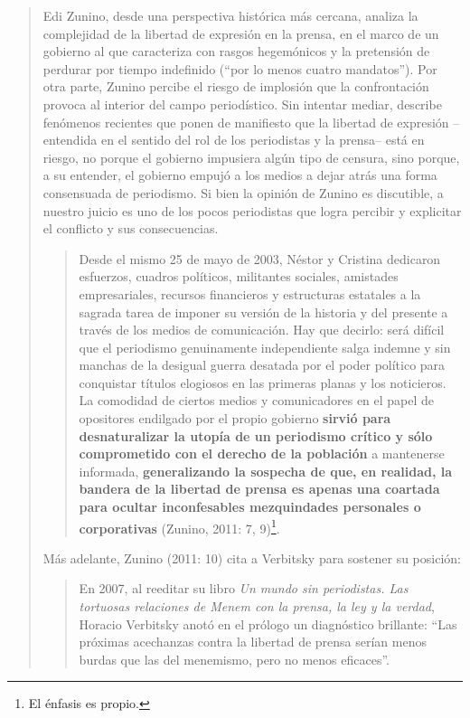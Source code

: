 {\begin{quote}
Edi Zunino, desde una perspectiva histórica más cercana, analiza la complejidad de la libertad de expresión en la prensa, en el marco de un gobierno al que caracteriza con rasgos hegemónicos y la pretensión de perdurar por tiempo indefinido (\enquote{por lo menos cuatro mandatos}). Por otra parte, Zunino percibe el riesgo de implosión que la confrontación provoca al interior del campo periodístico. Sin intentar mediar, describe fenómenos recientes que ponen de manifiesto que la libertad de expresión --entendida en el sentido del rol de los periodistas y la prensa-- está en riesgo, no porque el gobierno impusiera algún tipo de censura, sino porque, a su entender, el gobierno empujó a los medios a dejar atrás una forma consensuada de periodismo. Si bien la opinión de Zunino es discutible, a nuestro juicio es uno de los pocos periodistas que logra percibir y explicitar el conflicto y sus consecuencias.

\begin{quote}
Desde el mismo 25 de mayo de 2003, Néstor y Cristina dedicaron esfuerzos, cuadros políticos, militantes sociales, amistades empresariales, recursos financieros y estructuras estatales a la sagrada tarea de imponer su versión de la historia y del presente a través de los medios de comunicación. Hay que decirlo: será difícil que el periodismo genuinamente independiente salga indemne y sin manchas de la desigual guerra desatada por el poder político para conquistar títulos elogiosos en las primeras planas y los noticieros. La comodidad de ciertos medios y comunicadores en el papel de opositores endilgado por el propio gobierno \textbf{sirvió para desnaturalizar la utopía de un periodismo crítico y sólo comprometido con el derecho de la población} a mantenerse informada, \textbf{generalizando la sospecha de que, en realidad, la bandera de la libertad de prensa es apenas una coartada para ocultar inconfesables mezquindades personales o corporativas} (Zunino, 2011: 7, 9)\footnote{El énfasis es propio.}.
\end{quote}

Más adelante, Zunino (2011: 10) cita a Verbitsky para sostener su posición:

\begin{quote}
En 2007, al reeditar su libro \emph{Un mundo sin periodistas. Las tortuosas relaciones de Menem con la prensa, la ley y la verdad}, Horacio Verbitsky anotó en el prólogo un diagnóstico brillante: \enquote{Las próximas acechanzas contra la libertad de prensa serían menos burdas que las del menemismo, pero no menos eficaces}.
\end{quote}


\end{quote}}
